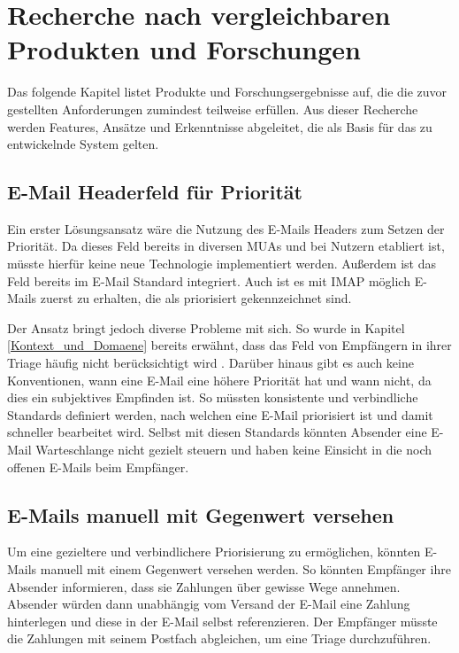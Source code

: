 
\chapter{Recherche nach vergleichbaren Produkten und Forschungen}
\label{Recherche_nach_vergleichbaren_Produkten_und_Forschungen}

Das folgende Kapitel listet Produkte und Forschungsergebnisse auf, die die zuvor gestellten Anforderungen zumindest teilweise erfüllen. Aus dieser Recherche werden Features, Ansätze und Erkenntnisse abgeleitet, die als Basis für das zu entwickelnde System gelten.

\section{E-Mail Headerfeld für Priorität}
Ein erster Lösungsansatz wäre die Nutzung des E-Mails Headers zum Setzen der Priorität. Da dieses Feld bereits in diversen MUAs und bei Nutzern etabliert ist, müsste hierfür keine neue Technologie implementiert werden. Außerdem ist das Feld bereits im E-Mail Standard integriert. Auch ist es mit IMAP möglich E-Mails zuerst zu erhalten, die als priorisiert gekennzeichnet sind.

Der Ansatz bringt jedoch diverse Probleme mit sich. So wurde in Kapitel \ref{Kontext_und_Domaene} bereits erwähnt, dass das Feld von Empfängern in ihrer Triage häufig nicht berücksichtigt wird \citep[S. 279 f.]{Whittaker1996}. Darüber hinaus gibt es auch keine Konventionen, wann eine E-Mail eine höhere Priorität hat und wann nicht, da dies ein subjektives Empfinden ist. So müssten konsistente und verbindliche Standards definiert werden, nach welchen eine E-Mail priorisiert ist und damit schneller bearbeitet wird. Selbst mit diesen Standards könnten Absender eine E-Mail Warteschlange nicht gezielt steuern und haben keine Einsicht in die noch offenen E-Mails beim Empfänger.

\section{E-Mails manuell mit Gegenwert versehen}
Um eine gezieltere und verbindlichere Priorisierung zu ermöglichen, könnten E-Mails manuell mit einem Gegenwert versehen werden. So könnten Empfänger ihre Absender informieren, dass sie Zahlungen über gewisse Wege annehmen. Absender würden dann unabhängig vom Versand der E-Mail eine Zahlung hinterlegen und diese in der E-Mail selbst referenzieren. Der Empfänger müsste die Zahlungen mit seinem Postfach abgleichen, um eine Triage durchzuführen.


